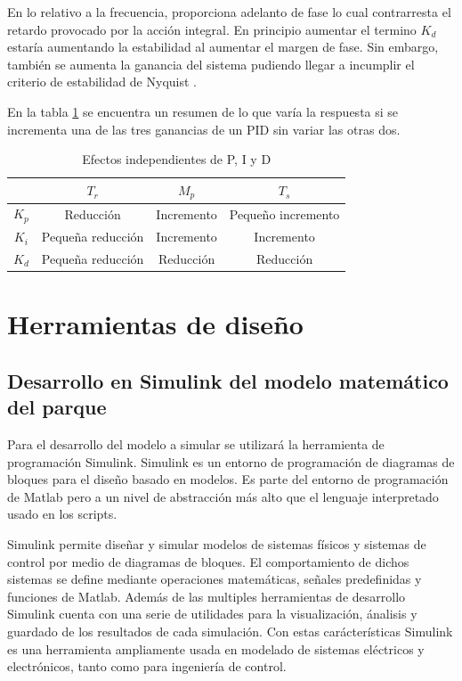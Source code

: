 \documentclass{book}
\begin{document}
En lo relativo a la frecuencia, proporciona adelanto de fase lo cual contrarresta el retardo provocado por la acci\'on integral. En principio aumentar el termino $K_d$ estar\'ia aumentando la estabilidad al aumentar el margen de fase. Sin embargo, tambi\'en se aumenta la ganancia del sistema pudiendo llegar a incumplir el criterio de estabilidad de Nyquist \cite{PIDtunning}.\par

En la tabla \ref{ta:tuning} se encuentra un resumen de lo que var\'ia la respuesta si se incrementa una de las tres ganancias de un PID sin variar las otras dos. \par

\begin{table}[h!]
\centering
\caption{Efectos independientes de P, I y D \cite{PIDtunning}}
\label{ta:tuning}
\begin{tabular}{c|ccc}
	 & $T_r$    & $M_p$ & $T_s$ \\ \hline
$K_p$         & Reducci\'on   & Incremento     & Pequeño incremento          \\
$K_i$        & Pequeña reducci\'on & Incremento       & Incremento          \\
$K_d$        & Pequeña reducci\'on & Reducci\'on     & Reducci\'on      
\end{tabular}
\end{table}


\chapter{Herramientas de diseño}


	\section{Desarrollo en Simulink del modelo matem\'atico del parque}

Para el desarrollo del modelo a simular se utilizar\'a la herramienta de programaci\'on Simulink. Simulink es un entorno de programaci\'on de diagramas de bloques para el diseño basado en modelos. Es parte del entorno de programaci\'on de Matlab pero a un nivel de abstracci\'on m\'as alto que el lenguaje interpretado usado en los scripts. \par

Simulink permite diseñar y simular modelos de sistemas f\'isicos y sistemas de control por medio de diagramas de bloques. El comportamiento de dichos sistemas se define mediante operaciones matem\'aticas, señales predefinidas y funciones de Matlab. Adem\'as de las multiples herramientas de desarrollo Simulink cuenta con una serie de utilidades para la visualizaci\'on, \'analisis y guardado de los resultados de cada simulaci\'on. Con estas car\'acter\'isticas Simulink es una herramienta ampliamente usada en modelado de sistemas el\'ectricos y electr\'onicos, tanto como para ingenier\'ia de control. \par
\end{document}
